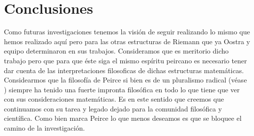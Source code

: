 \documentclass[
	fontsize=10pt, %
	twoside=true, %
	secnumdepth=1, %
	abstract=true, %
]{kaohandt}
\begin{document}

\section{Conclusiones} %
\label{sec:Conclusiones}

Como futuras investigaciones tenemos la visión de seguir realizando lo mismo que hemos realizado aquí pero para las otras estructuras de Riemann que ya Oostra y equipo determinaron en sus trabajos. Consideramos que es meritorio dicho trabajo pero que para que éste siga el mismo espíritu peircano es necesario tener dar cuenta de las interpretaciones filosoficas de dichas estructuras matemáticas. Considearmos que la filosofía de Peirce si bien es de un pluralismo radical (véase \cite{rosenthal1994}) siempre ha tenido una fuerte impronta filosófica en todo lo que tiene que ver con sus consideraciones matemáticas. Es en este sentido que creemos que continuamos con su tarea y legado dejado para la comunidad filosófica y científica. Como bien marca Peirce lo que menos deseamos es que se bloquee el camino de la investigación.


%
%



\printbibliography[title=Bibliografía] %
\nocite{peirce1931}
\end{document}
